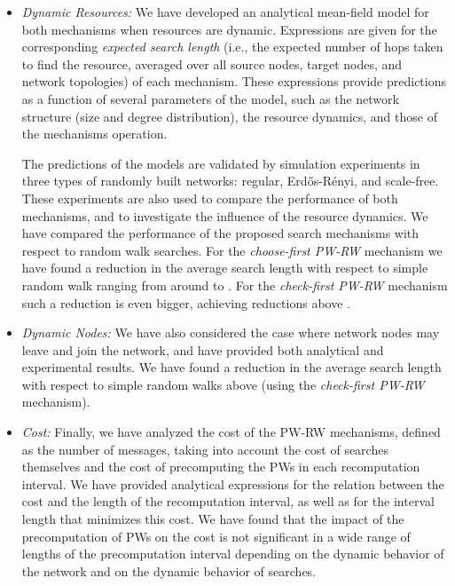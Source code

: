 \documentclass[]{elsarticle}
\newcommand{\ER}	{Erd\H{o}s-R\'{e}nyi}
\begin{document}
\begin{itemize}
\item{\it Dynamic Resources:}
We have developed an analytical mean-field model for both mechanisms when resources are dynamic. Expressions are given for the corresponding \emph{expected search length} (i.e., the expected number of hops taken to find the resource, averaged over all source nodes, target nodes, and network topologies) of each mechanism. These expressions provide predictions as a function of several parameters of the model, such as the network structure (size and degree distribution), the resource dynamics, and those of the mechanisms operation.

The predictions of the models are validated by simulation experiments in three types of randomly built networks: regular, \ER, and scale-free. These experiments are also used to compare the performance of both mechanisms, and to investigate the influence of the resource dynamics. We have  compared the performance of the proposed search mechanisms with respect to random walk searches. For the \emph{choose-first PW-RW} mechanism we have found a reduction in the average search length with respect to simple random walk ranging from around  to . For the \emph{check-first PW-RW} mechanism such a reduction is even bigger, achieving reductions above .

\item{\it Dynamic Nodes:}
We have also considered the case where network nodes may leave and join the network, and have provided both analytical and experimental results. We have found a reduction in the average search length with respect to simple random walks above  (using the \emph{check-first PW-RW} mechanism).

\item{\it Cost:}
Finally, we have analyzed the cost of the PW-RW mechanisms, defined as the number of messages, taking into account the cost of searches themselves and the cost of precomputing the PWs in each recomputation interval. We have provided analytical expressions for the relation between the cost and the length of the recomputation interval, as well as for the interval length that minimizes this cost. We have found that the impact of the precomputation of PWs on the cost is not significant in a wide range of lengths of the precomputation interval depending on the dynamic behavior of the network and on the dynamic behavior of searches.

\end{itemize}
\end{document}
